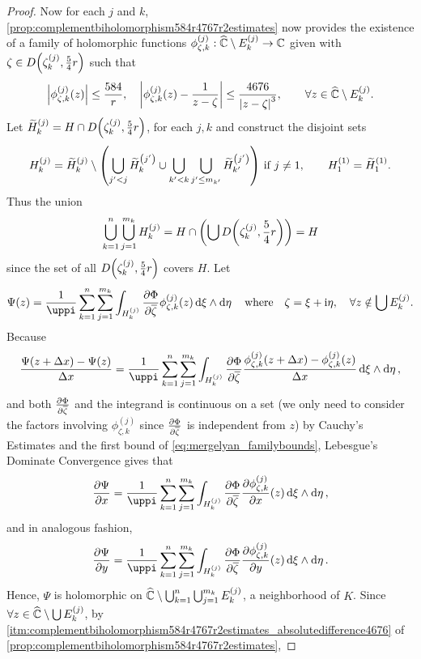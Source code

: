 \begin{proof}
    Now for each \(j\) and \(k\), \cref{prop:complementbiholomorphism584r4767r2estimates} now provides the existence of a family of holomorphic functions \(\phi_{\zeta,k}^{(j)}:\widehat{\mathbb{C}}\setminus E_k^{(j)}\to\mathbb{C}\) given with \(\zeta\in D\qty(\zeta_k^{(j)},\frac54r)\) such that
    \begin{equation}
        \abs{\phi_{\zeta,k}^{(j)}(z)}\leq\frac{584}r,\quad\abs{\phi_{\zeta,k}^{(j)}(z)-\frac{1}{z-\zeta}}\leq\frac{4676}{\abs{z-\zeta}^3},\qquad\forall z\in\widehat{\mathbb{C}}\setminus E_k^{(j)}.\label{eq:mergelyan_familybounds}
    \end{equation}
    Let \(\widetilde{H}_k^{(j)}=H\cap D\qty(\zeta_k^{(j)},\frac54r)\), for each \(j,k\) and construct the disjoint sets \[H_k^{(j)}=\widetilde{H}_k^{(j)}\setminus\qty(\bigcup_{j'<j}\widetilde{H}_k^{\qty(j')}\cup\bigcup_{k'<k}\bigcup_{j'\leq m_{k'}}\widetilde{H}_{k'}^{\qty(j')})\text{ if }j\neq 1,\qquad H_1^{(1)}=\widetilde{H}_1^{(1)}.\]
    Thus the union \[\bigcup_{k=1}^n\bigcup_{j=1}^{m_k}H_k^{(j)}=H\cap\qty(\bigcup D\qty(\zeta_k^{(j)},\frac54r))=H\] since the set of all \(D\qty(\zeta_k^{(j)},\frac54r)\) covers \(H\). Let \[\Psi(z)=\frac{1}{\uppi}\sum_{k=1}^n\sum_{j=1}^{m_k}\int_{H_k^{(j)}}\pdv{\Phi}{\overline{\zeta}}\phi_{\zeta,k}^{(j)}(z)\dd{\xi}\wedge\dd{\eta}\qq{where}\zeta=\xi+\ii\eta,\quad\forall z\notin\bigcup E_k^{(j)}.\]
    Because \[\frac{\Psi(z+\Delta x)-\Psi(z)}{\Delta x}=\frac{1}{\uppi}\sum_{k=1}^n\sum_{j=1}^{m_k}\int_{H_k^{(j)}}\pdv{\Phi}{\overline{\zeta}}\frac{\phi_{\zeta,k}^{(j)}(z+\Delta x)-\phi_{\zeta,k}^{(j)}(z)}{\Delta x}\dd{\xi}\wedge\dd{\eta},\]
    and both \(\pdv{\Phi}{\overline{\zeta}}\) and the integrand is continuous on a set (we only need to consider the factors involving \(\phi_{\zeta,k}^{(j)}\) since \(\pdv{\Phi}{\overline{\zeta}}\) is independent from \(z\)) by Cauchy's Estimates and the first bound of \cref{eq:mergelyan_familybounds}, Lebesgue's Dominate Convergence gives that
    \[\pdv{\Psi}{x}=\frac{1}{\uppi}\sum_{k=1}^n\sum_{j=1}^{m_k}\int_{H_k^{(j)}}\pdv{\Phi}{\overline{\zeta}}\pdv{\phi_{\zeta,k}^{(j)}}{x}\qty(z)\dd{\xi}\wedge\dd{\eta},\] and in analogous fashion, \[\pdv{\Psi}{y}=\frac{1}{\uppi}\sum_{k=1}^n\sum_{j=1}^{m_k}\int_{H_k^{(j)}}\pdv{\Phi}{\overline{\zeta}}\pdv{\phi_{\zeta,k}^{(j)}}{y}\qty(z)\dd{\xi}\wedge\dd{\eta}.\]
    Hence, \(\Psi\) is holomorphic on \(\widehat{\mathbb{C}}\setminus\bigcup_{k=1}^n\bigcup_{j=1}^{m_k} E_{k}^{(j)}\), a neighborhood of \(K\). Since \(\forall z\in\widehat{\mathbb{C}}\setminus\bigcup E_k^{(j)}\), by \cref{itm:complementbiholomorphism584r4767r2estimates_absolutedifference4676} of \cref{prop:complementbiholomorphism584r4767r2estimates},

\end{proof}
